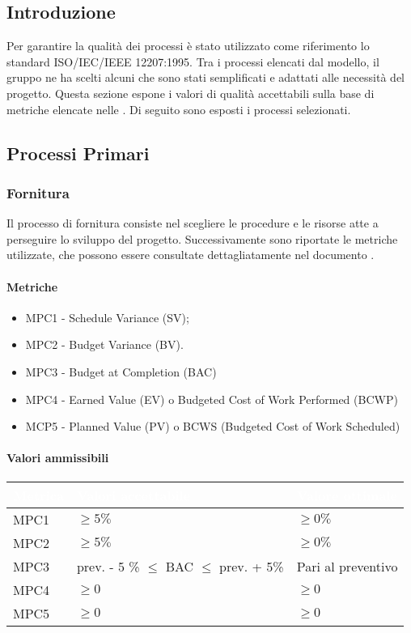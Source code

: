 
\subsection{Introduzione}
Per garantire la qualità dei processi è stato utilizzato come riferimento lo standard ISO/IEC/IEEE 12207:1995. Tra i processi elencati dal modello, il gruppo ne ha scelti alcuni che sono stati semplificati e adattati alle necessità del progetto. Questa sezione espone i valori di qualità accettabili sulla base di metriche elencate nelle . Di seguito sono esposti i processi selezionati.

\subsection{Processi Primari}

\subsubsection{Fornitura}
Il processo di fornitura consiste nel scegliere le procedure e le risorse atte a perseguire lo sviluppo del progetto. Successivamente sono riportate le metriche utilizzate, che possono essere consultate dettagliatamente nel documento .

\paragraph{Metriche}
\begin{itemize}
	\item MPC1 - Schedule Variance (SV);
	\item MPC2 - Budget Variance (BV).
	\item MPC3 - Budget at Completion (BAC)
	\item MPC4 - Earned Value (EV) o Budgeted Cost of Work Performed (BCWP)
	\item MCP5 - Planned Value (PV) o BCWS (Budgeted Cost of Work Scheduled)
\end{itemize}

\paragraph{Valori ammissibili}
{
\renewcommand{\arraystretch}{1.5}
\centering
\begin{longtable}{C{2.5cm} C{7cm} C{4cm}}
\textcolor{white}{\textbf{Metrica}}&
\textcolor{white}{\textbf{Valori accettabile}}&
\textcolor{white}{\textbf{Valore ottimale}}\\	
\endhead

MPC1 & $\geq 5\%$ & $\geq 0\%$ \\
MPC2 & $\geq 5\%$ & $\geq 0\%$ \\
MPC3 & prev. - 5 \% $ \leq $ BAC $ \leq $ prev. + 5\% & Pari al preventivo  \\
MPC4 & $\geq 0$  & $\geq 0$ \\
MPC5 & $\geq 0$  & $\geq 0$ \\
\end{longtable}
}



